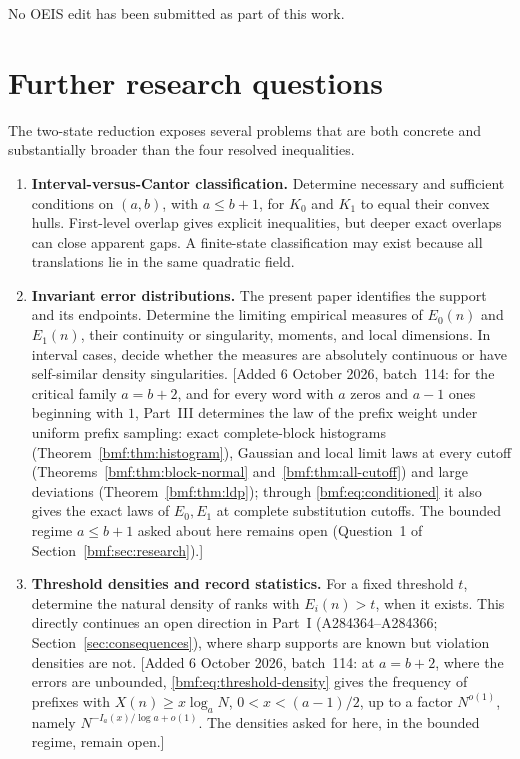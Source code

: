 \documentclass[11pt]{article}
\numberwithin{equation}{section}
\theoremstyle{definition}
\theoremstyle{remark}
\begin{document}
No OEIS edit has been submitted as part of this work.

\section{Further research questions}\label{qmw:sec:further}

The two-state reduction exposes several problems that are both concrete and
substantially broader than the four resolved inequalities.

\begin{enumerate}[leftmargin=*,itemsep=5pt]
\item \textbf{Interval-versus-Cantor classification.}
Determine necessary and sufficient conditions on $(a,b)$, with $a\leq b+1$,
for $K_0$ and $K_1$ to equal their convex hulls.  First-level overlap gives
explicit inequalities, but deeper exact overlaps can close apparent gaps.
A finite-state classification may exist because all translations lie in the
same quadratic field.

\item \textbf{Invariant error distributions.}
The present paper identifies the support and its endpoints.  Determine the
limiting empirical measures of $E_0(n)$ and $E_1(n)$, their continuity or
singularity, moments, and local dimensions.  In interval cases, decide
whether the measures are absolutely continuous or have self-similar density
singularities.
[Added 6 October 2026, batch~114: for the critical family $a=b+2$, and for
every word with $a$ zeros and $a-1$ ones beginning with $1$, Part~III
determines the law of the prefix weight under uniform prefix sampling:
exact complete-block histograms (Theorem~\ref{bmf:thm:histogram}),
Gaussian and local limit laws at every cutoff
(Theorems~\ref{bmf:thm:block-normal} and~\ref{bmf:thm:all-cutoff}) and
large deviations (Theorem~\ref{bmf:thm:ldp}); through
\eqref{bmf:eq:conditioned} it also gives the exact laws of $E_0,E_1$ at
complete substitution cutoffs. The bounded regime $a\leq b+1$
asked about here remains open (Question~1 of
Section~\ref{bmf:sec:research}).]

\item \textbf{Threshold densities and record statistics.}
For a fixed threshold $t$, determine the natural density of ranks with
$E_i(n)>t$, when it exists.  This directly continues an open direction in
Part~I (A284364--A284366; Section~\ref{sec:consequences}), where sharp supports are known but violation
densities are not.
[Added 6 October 2026, batch~114: at $a=b+2$, where the errors are
unbounded, \eqref{bmf:eq:threshold-density} gives the frequency of prefixes
with $X(n)\geq x\log_aN$, $0<x<(a-1)/2$, up to a factor $N^{o(1)}$, namely
$N^{-I_a(x)/\log a+o(1)}$. The densities asked for here, in the bounded
regime, remain open.]


\end{enumerate}
\end{document}
